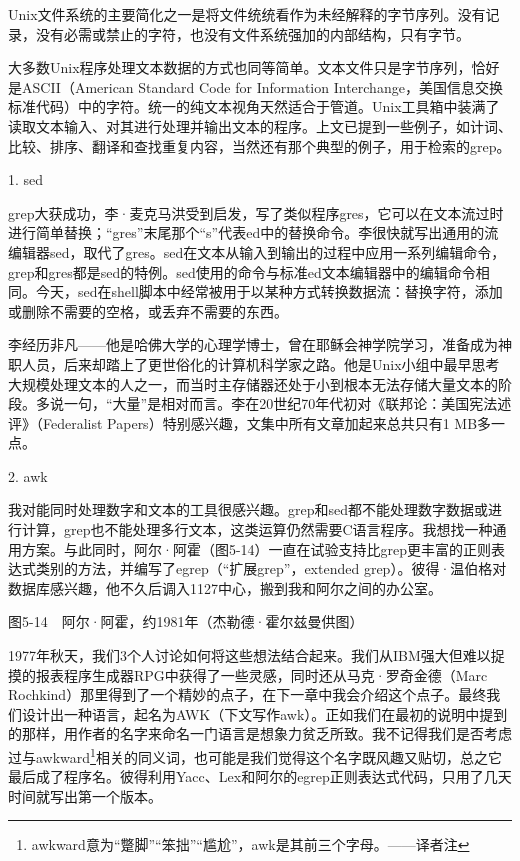 \documentclass[a4paper,12pt,UTF8,twoside]{ctexbook}
\begin{document}
Unix文件系统的主要简化之一是将文件统统看作为未经解释的字节序列。没有记录，没有必需或禁止的字符，也没有文件系统强加的内部结构，只有字节。

大多数Unix程序处理文本数据的方式也同等简单。文本文件只是字节序列，恰好是ASCII（American Standard Code for Information Interchange，美国信息交换标准代码）中的字符。统一的纯文本视角天然适合于管道。Unix工具箱中装满了读取文本输入、对其进行处理并输出文本的程序。上文已提到一些例子，如计词、比较、排序、翻译和查找重复内容，当然还有那个典型的例子，用于检索的grep。





1. sed


grep大获成功，李·麦克马洪受到启发，写了类似程序gres，它可以在文本流过时进行简单替换；“gres”末尾那个“s”代表ed中的替换命令。李很快就写出通用的流编辑器sed，取代了gres。sed在文本从输入到输出的过程中应用一系列编辑命令，grep和gres都是sed的特例。sed使用的命令与标准ed文本编辑器中的编辑命令相同。今天，sed在shell脚本中经常被用于以某种方式转换数据流：替换字符，添加或删除不需要的空格，或丢弃不需要的东西。

李经历非凡——他是哈佛大学的心理学博士，曾在耶稣会神学院学习，准备成为神职人员，后来却踏上了更世俗化的计算机科学家之路。他是Unix小组中最早思考大规模处理文本的人之一，而当时主存储器还处于小到根本无法存储大量文本的阶段。多说一句，“大量”是相对而言。李在20世纪70年代初对《联邦论：美国宪法述评》（Federalist Papers）特别感兴趣，文集中所有文章加起来总共只有1 MB多一点。





2. awk


我对能同时处理数字和文本的工具很感兴趣。grep和sed都不能处理数字数据或进行计算，grep也不能处理多行文本，这类运算仍然需要C语言程序。我想找一种通用方案。与此同时，阿尔·阿霍（图5-14）一直在试验支持比grep更丰富的正则表达式类别的方法，并编写了egrep（“扩展grep”，extended grep）。彼得·温伯格对数据库感兴趣，他不久后调入1127中心，搬到我和阿尔之间的办公室。



图5-14　阿尔·阿霍，约1981年（杰勒德·霍尔兹曼供图）

1977年秋天，我们3个人讨论如何将这些想法结合起来。我们从IBM强大但难以捉摸的报表程序生成器RPG中获得了一些灵感，同时还从马克·罗奇金德（Marc Rochkind）那里得到了一个精妙的点子，在下一章中我会介绍这个点子。最终我们设计出一种语言，起名为AWK（下文写作awk）。正如我们在最初的说明中提到的那样，用作者的名字来命名一门语言是想象力贫乏所致。我不记得我们是否考虑过与awkward\footnote{awkward意为“蹩脚”“笨拙”“尴尬”，awk是其前三个字母。——译者注}相关的同义词，也可能是我们觉得这个名字既风趣又贴切，总之它最后成了程序名。彼得利用Yacc、Lex和阿尔的egrep正则表达式代码，只用了几天时间就写出第一个版本。
\end{document}

